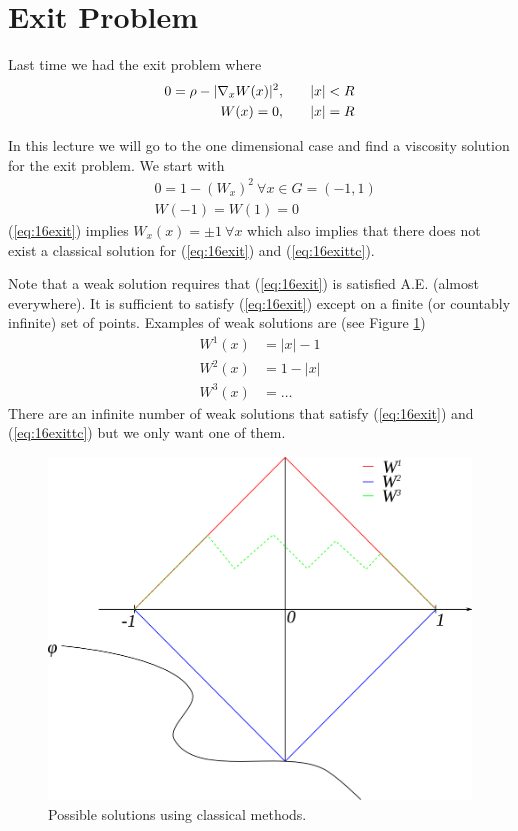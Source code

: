 
\mainmatter
\setcounter{page}{1}

\lectureseries[\course]{\course}

\date{November 24, 2009}

\setaddress

\setcounter{lecture}{15}
\setcounter{chapter}{15}


\section{Exit Problem}
Last time we had the exit problem where
\begin{align*}
0 = \rho - |\nabla_xW(x)|^2, &\qquad |x|<R \\
W(x) = 0, &\qquad |x|=R
\end{align*}

In this lecture we will go to the one dimensional case and find a viscosity solution for the exit problem. We start with
\begin{align}
\label{eq:16exit}
&0 = 1-(W_x)^2 ~\forall x\in G=(-1,1) \\
\label{eq:16exittc}
&W(-1) = W(1) = 0
\end{align}
(\ref{eq:16exit}) implies $W_x(x)=\pm1 ~\forall x$ which also implies that there does not exist a classical solution for (\ref{eq:16exit}) and (\ref{eq:16exittc}).

Note that a weak solution requires that (\ref{eq:16exit}) is satisfied A.E. (almost everywhere). It is sufficient to satisfy (\ref{eq:16exit}) except on a finite (or countably infinite) set of points. Examples of weak solutions are (see Figure \ref{fig:16w})
\begin{align*}
W^1(x) &= |x|-1 \\
W^2(x) &= 1-|x| \\
W^3(x) &= \ldots
\end{align*}
There are an infinite number of weak solutions that satisfy (\ref{eq:16exit}) and (\ref{eq:16exittc}) but we only want one of them.

\begin{figure}[ht!]
	\centering
	\includegraphics[width=.4\textwidth]{images/16w}
	\caption{Possible solutions using classical methods.}
	\label{fig:16w}
\end{figure}

